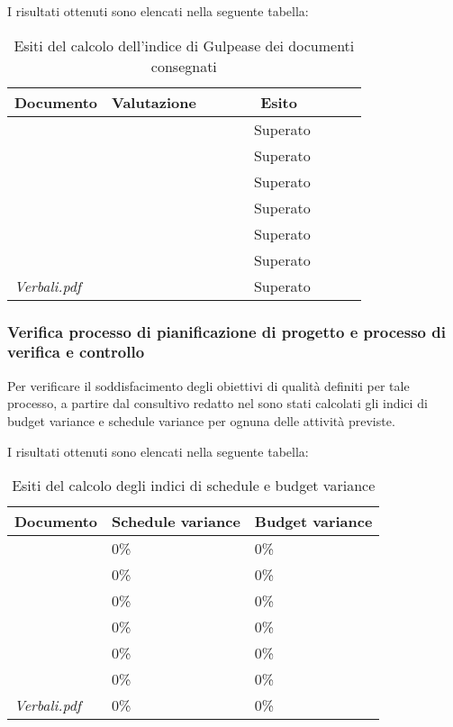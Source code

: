 		I risultati ottenuti sono elencati nella seguente tabella:
		\begin{table}[H]
		\begin{tabular}{|l|l|l|}
		\hline
		\textbf{Documento} 		&\textbf{Valutazione} &\textbf{~~~~~~Esito~~~~~~} \\
		\hline
		\PdQ 					&		&~~~~~~Superato~~~~~~\\
		\NdP 					&		&~~~~~~Superato~~~~~~\\
		\AdR 					&		&~~~~~~Superato~~~~~~\\
		\PdP 					&		&~~~~~~Superato~~~~~~\\
		\ST 					&		&~~~~~~Superato~~~~~~\\	
		\Glossario 				&		&~~~~~~Superato~~~~~~\\
		\textit{Verbali.pdf} 			&		&~~~~~~Superato~~~~~~\\
		\hline
		\end{tabular}
		\caption{Esiti del calcolo dell'indice di Gulpease dei documenti consegnati}
		\end{table}
		
		\subsubsection{Verifica processo di pianificazione di progetto e processo di verifica e controllo}
		Per verificare il soddisfacimento degli obiettivi di qualità definiti per tale processo, a partire dal 				consultivo redatto nel \PdP sono stati calcolati gli indici di budget variance e schedule variance per ognuna delle attività previste.
		
		I risultati ottenuti sono elencati nella seguente tabella:	
		\begin{table}[H]
		\begin{tabular}{|l|l|l|}
		\hline
		\textbf{Documento} 		&\textbf{Schedule variance} &\textbf{Budget variance} 		\\
		\hline
		\PdQ 					&0\%		&0\%\\
		\NdP 					&0\%		&0\%\\
		\AdR 					&0\%		&0\%\\
		\PdP 					&0\%		&0\%\\
		\ST					&0\%		&0\%\\
		\Glossario 				&0\%		&0\%\\
		\textit{Verbali.pdf} 			&0\%		&0\%\\
		\hline
		\end{tabular}
		\caption{Esiti del calcolo degli indici di schedule e budget variance}
		\end{table}
		
